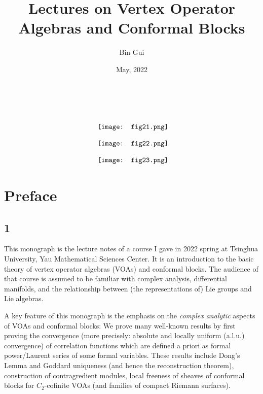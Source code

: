 \documentclass[12pt,a4paper,notitlepage]{article}
\title{Lectures on Vertex Operator Algebras and Conformal Blocks}
\author{{\sc Bin Gui}
}
\date{May, 2022}
\theoremstyle{definition}
\theoremstyle{plain}
\numberwithin{equation}{section}
\begin{document}
\sloppy %
	\setcounter{page}{0}
	\setcounter{section}{-1}
	






	
	\maketitle
\thispagestyle{empty}	
\begin{gather*}
{~}\\[3ex]
	\vcenter{\hbox{{
				\texttt{[image: fig21.png]}}}}\\[2ex]
	\vcenter{\hbox{{
				\texttt{[image: fig22.png]}}}}\\[2ex]
	\vcenter{\hbox{{
				\texttt{[image: fig23.png]}}}}
\end{gather*}




	
	\newpage
\tableofcontents
	


\newpage

\section*{Preface}


\subsection*{1}


This monograph is the lecture notes of a course I gave in 2022 spring at Tsinghua University, Yau Mathematical Sciences Center. It is an introduction to the basic theory of vertex operator algebras (VOAs) and conformal blocks. The audience of that course is assumed to be familiar with complex analysis, differential manifolds, and the relationship between (the representations of) Lie groups and Lie algebras. 

A key feature of this monograph is the emphasis on the \emph{complex analytic} aspects of VOAs and conformal blocks: We prove many well-known results by first proving the convergence (more precisely: absolute and locally uniform (a.l.u.) convergence) of  correlation functions which are defined a priori as formal power/Laurent series of some formal variables. These results include Dong's Lemma and Goddard uniqueness (and hence the reconstruction theorem), construction of contragredient modules, local freeness of sheaves of conformal blocks for $C_2$-cofinite VOAs (and families of compact Riemann surfaces). 
\end{document}
